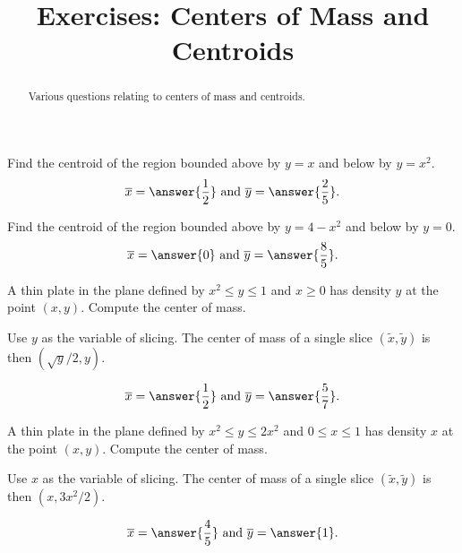 \documentclass{ximera}
\title{Exercises: Centers of Mass and Centroids}
\begin{document}
\begin{abstract}
Various questions relating to centers of mass and centroids.
\end{abstract}
\maketitle


\begin{exercise}%
Find the centroid of the region bounded above by $y = x$ and below by $y = x^2$.
\[ \overline{x} = \answer{\frac{1}{2}} \text{ and } \overline{y} = \answer{\frac{2}{5}}. \]
\end{exercise}

\begin{exercise}%
Find the centroid of the region bounded above by $y = 4-x^2$ and below by $y = 0$.
\[ \overline{x} = \answer{0} \text{ and } \overline{y} = \answer{\frac{8}{5}}. \]
\end{exercise}

\begin{exercise}
A thin plate in the plane defined by $x^2 \leq y \leq 1$ and $x \geq 0$ has density $y$ at the point $(x,y)$. Compute the center of mass.
\begin{hint}
Use $y$ as the variable of slicing. The center of mass of a single slice $(\tilde x, \tilde y)$ is then $(\sqrt{y}/2,y)$.
\end{hint}
\[ \overline{x} = \answer{\frac{1}{2}} \text{ and } \overline{y} = \answer{\frac{5}{7}}. \]
\end{exercise}

\begin{exercise}
A thin plate in the plane defined by $x^2 \leq y \leq 2x^2$ and $0 \leq x \leq 1$ has density $x$ at the point $(x,y)$. Compute the center of mass.
\begin{hint}
Use $x$ as the variable of slicing. The center of mass of a single slice $(\tilde x, \tilde y)$ is then $(x,3x^2/2)$.
\end{hint}
\[ \overline{x} = \answer{\frac{4}{5}} \text{ and } \overline{y} = \answer{1}. \]
\end{exercise}
\end{document}
